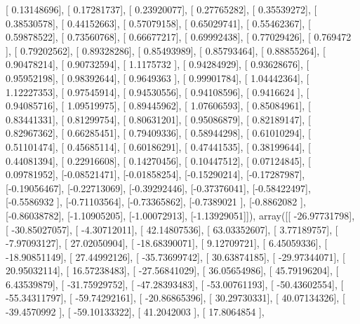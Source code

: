 \documentclass{article}
\begin{document}
       [ 0.13148696],
       [ 0.17281737],
       [ 0.23920077],
       [ 0.27765282],
       [ 0.35539272],
       [ 0.38530578],
       [ 0.44152663],
       [ 0.57079158],
       [ 0.65029741],
       [ 0.55462367],
       [ 0.59878522],
       [ 0.73560768],
       [ 0.66677217],
       [ 0.69992438],
       [ 0.77029426],
       [ 0.769472  ],
       [ 0.79202562],
       [ 0.89328286],
       [ 0.85493989],
       [ 0.85793464],
       [ 0.88855264],
       [ 0.90478214],
       [ 0.90732594],
       [ 1.1175732 ],
       [ 0.94284929],
       [ 0.93628676],
       [ 0.95952198],
       [ 0.98392644],
       [ 0.9649363 ],
       [ 0.99901784],
       [ 1.04442364],
       [ 1.12227353],
       [ 0.97545914],
       [ 0.94530556],
       [ 0.94108596],
       [ 0.9416624 ],
       [ 0.94085716],
       [ 1.09519975],
       [ 0.89445962],
       [ 1.07606593],
       [ 0.85084961],
       [ 0.83441331],
       [ 0.81299754],
       [ 0.80631201],
       [ 0.95086879],
       [ 0.82189147],
       [ 0.82967362],
       [ 0.66285451],
       [ 0.79409336],
       [ 0.58944298],
       [ 0.61010294],
       [ 0.51101474],
       [ 0.45685114],
       [ 0.60186291],
       [ 0.47441535],
       [ 0.38199644],
       [ 0.44081394],
       [ 0.22916608],
       [ 0.14270456],
       [ 0.10447512],
       [ 0.07124845],
       [ 0.09781952],
       [-0.08521471],
       [-0.01858254],
       [-0.15290214],
       [-0.17287987],
       [-0.19056467],
       [-0.22713069],
       [-0.39292446],
       [-0.37376041],
       [-0.58422497],
       [-0.5586932 ],
       [-0.71103564],
       [-0.73365862],
       [-0.7389021 ],
       [-0.8862082 ],
       [-0.86038782],
       [-1.10905205],
       [-1.00072913],
       [-1.13929051]]), array([[ -26.97731798],
       [ -30.85027057],
       [  -4.30712011],
       [  42.14807536],
       [  63.03352607],
       [   3.77189757],
       [  -7.97093127],
       [  27.02050904],
       [ -18.68390071],
       [   9.12709721],
       [   6.45059336],
       [ -18.90851149],
       [  27.44992126],
       [ -35.73699742],
       [  30.63874185],
       [ -29.97344071],
       [  20.95032114],
       [  16.57238483],
       [ -27.56841029],
       [  36.05654986],
       [  45.79196204],
       [   6.43539879],
       [ -31.75929752],
       [ -47.28393483],
       [ -53.00761193],
       [ -50.43602554],
       [ -55.34311797],
       [ -59.74292161],
       [ -20.86865396],
       [  30.29730331],
       [  40.07134326],
       [ -39.4570992 ],
       [ -59.10133322],
       [  41.2042003 ],
       [  17.8064854 ],
\end{document}
